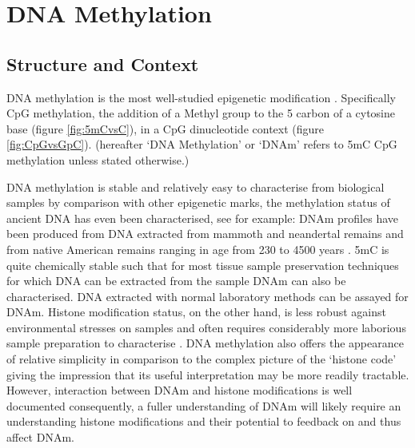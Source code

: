 \documentclass[]{book}
\begin{document}
\hypertarget{dna-methylation}{%
\section{DNA Methylation}\label{dna-methylation}}

\hypertarget{structure-and-context}{%
\subsection{Structure and Context}\label{structure-and-context}}

DNA methylation is the most well-studied epigenetic modification \citep{Haluskova2010}. Specifically CpG methylation, the addition of a Methyl group to the 5 carbon of a cytosine base (figure \ref{fig:5mCvsC}), in a CpG dinucleotide context (figure \ref{fig:CpGvsGpC}). (hereafter `DNA Methylation' or `DNAm' refers to 5mC CpG methylation unless stated otherwise.)

DNA methylation is stable and relatively easy to characterise from biological samples by comparison with other epigenetic marks, the methylation status of ancient DNA has even been characterised, see for example: DNAm profiles have been produced from DNA extracted from mammoth and neandertal remains \citep{Briggs2010} and from native American remains ranging in age from 230 to 4500 years \citep{Smith2015}. 5mC is quite chemically stable such that for most tissue sample preservation techniques for which DNA can be extracted from the sample DNAm can also be characterised. DNA extracted with normal laboratory methods can be assayed for DNAm. Histone modification status, on the other hand, is less robust against environmental stresses on samples and often requires considerably more laborious sample preparation to characterise \citep{Bauden2017}. DNA methylation also offers the appearance of relative simplicity in comparison to the complex picture of the `histone code' giving the impression that its useful interpretation may be more readily tractable. However, interaction between DNAm and histone modifications is well documented \citep[\citet{Esteve2006},\citet{Rose2014}]{Hashimshony2003} consequently, a fuller understanding of DNAm will likely require an understanding histone modifications and their potential to feedback on and thus affect DNAm.
\end{document}
